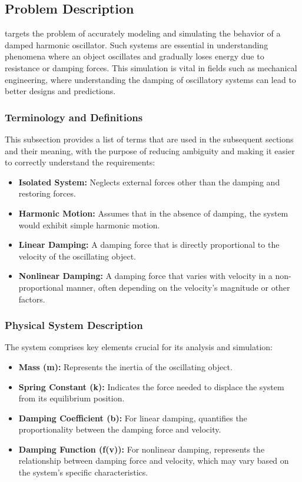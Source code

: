 \documentclass[12pt]{article}
\begin{document}
\subsection{Problem Description} \label{Sec_pd}

\progname{} targets the problem of accurately modeling and simulating the behavior 
of a damped harmonic oscillator. Such systems are essential in understanding 
phenomena where an object oscillates and gradually loses energy due to resistance 
or damping forces. This simulation is vital in fields such as mechanical 
engineering, where understanding the damping of oscillatory systems can lead to 
better designs and predictions.

\subsubsection{Terminology and  Definitions}

This subsection provides a list of terms that are used in the subsequent
sections and their meaning, with the purpose of reducing ambiguity and making 
it easier to correctly understand the requirements:

\begin{itemize}

\item \textbf{Isolated System:} Neglects external forces other than the damping 
and restoring forces.
\item \textbf{Harmonic Motion:} Assumes that in the absence of damping, the system 
would exhibit simple harmonic motion.
\item \textbf{Linear Damping:} A damping force that is directly proportional to 
the velocity of the oscillating object.
\item \textbf{Nonlinear Damping:} A damping force that varies with velocity in a 
non-proportional manner, often depending on the velocity's magnitude or other factors.

\end{itemize}

\subsubsection{Physical System Description} \label{sec_phySystDescrip}

The system comprises key elements crucial for its analysis and simulation:
\begin{itemize}
  \item \textbf{Mass (m):} Represents the inertia of the oscillating object.
  \item \textbf{Spring Constant (k):} Indicates the force needed to displace the 
  system from its equilibrium position.
  \item \textbf{Damping Coefficient (b):} For linear damping, quantifies the 
  proportionality between the damping force and velocity.
  \item \textbf{Damping Function (f(v)):} For nonlinear damping, represents the 
  relationship between damping force and velocity, which may vary based on the 
  system's specific characteristics.
\end{itemize}
 
\end{document}
